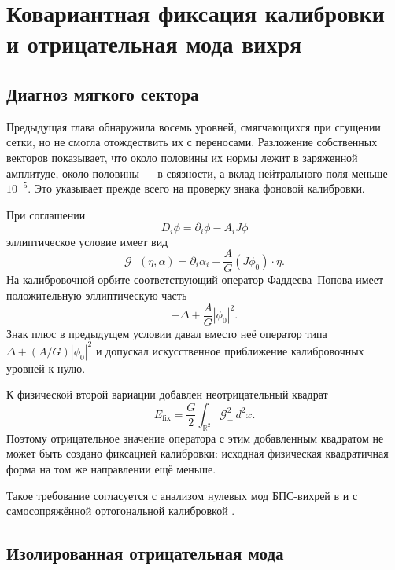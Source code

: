 \chapter{Ковариантная фиксация калибровки и отрицательная мода вихря}

\section{Диагноз мягкого сектора}

Предыдущая глава обнаружила восемь уровней, смягчающихся при сгущении
сетки, но не смогла отождествить их с переносами. Разложение собственных
векторов показывает, что около половины их нормы лежит в заряженной
амплитуде, около половины --- в связности, а вклад нейтрального поля
меньше $10^{-5}$. Это указывает прежде всего на проверку знака фоновой
калибровки.

При соглашении
\begin{equation}
 D_i\phi=\partial_i\phi-A_iJ\phi
\end{equation}
эллиптическое условие имеет вид
\begin{equation}
 \mathcal G_-(\eta,\alpha)
 =\partial_i\alpha_i-\frac AG(J\phi_0)\mathbin{\cdot}\eta.
 \label{eq:v6-covariant-minus-gauge}
\end{equation}
На калибровочной орбите соответствующий оператор Фаддеева--Попова имеет
положительную эллиптическую часть
\begin{equation}
 -\Delta+\frac AG|\phi_0|^2.
\end{equation}
Знак плюс в предыдущем условии давал вместо неё оператор типа
$\Delta+(A/G)|\phi_0|^2$ и допускал искусственное приближение
калибровочных уровней к нулю.

К физической второй вариации добавлен неотрицательный квадрат
\begin{equation}
 E_{\mathrm{fix}}=\frac G2\int_{\mathbb R^2}\mathcal G_-^2\,d^2x.
 \label{eq:v6-positive-gauge-fixing-square}
\end{equation}
Поэтому отрицательное значение оператора с этим добавленным квадратом не
может быть создано фиксацией калибровки: исходная физическая квадратичная
форма на том же направлении ещё меньше.

Такое требование согласуется с анализом нулевых мод БПС-вихрей в
 и с самосопряжённой ортогональной калибровкой
.

\section{Изолированная отрицательная мода}

